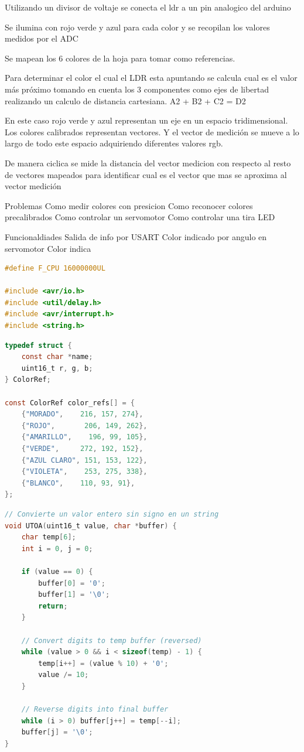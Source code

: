 Utilizando un divisor de voltaje se conecta el ldr a un pin analogico del arduino

Se ilumina con rojo verde y azul para cada color y se recopilan los valores medidos por el ADC

Se mapean los 6 colores de la hoja para tomar como referencias.

Para determinar el color el cual el LDR esta apuntando
se calcula cual es el valor más próximo tomando
en cuenta los 3 componentes como ejes de libertad
realizando un calculo de distancia cartesiana.
A2 + B2 + C2 = D2

En este caso rojo verde y azul representan un eje en un espacio tridimensional. 
Los colores calibrados representan vectores. Y el vector de medición se 
mueve a lo largo de todo este espacio adquiriendo diferentes valores rgb.

De manera ciclica se mide la distancia del vector medicion con respecto 
al resto de vectores mapeados para identificar cual es el vector que 
mas se aproxima al vector medición

Problemas
Como medir colores con presicion
Como reconocer colores precalibrados
Como controlar un servomotor
Como controlar una tira LED

Funcionaldiades
Salida de info por USART
Color indicado por angulo en servomotor
Color indica








\begin{lstlisting}[language=C, caption={Librerias utilizadas}]
#define F_CPU 16000000UL

#include <avr/io.h>
#include <util/delay.h>
#include <avr/interrupt.h>
#include <string.h>
\end{lstlisting}

\begin{lstlisting}[language=C, caption={Mapeado de colores}]
typedef struct {
	const char *name;
	uint16_t r, g, b;
} ColorRef;

const ColorRef color_refs[] = {
	{"MORADO",    216, 157, 274},
	{"ROJO",       206, 149, 262},
	{"AMARILLO",    196, 99, 105},
	{"VERDE",     272, 192, 152},
	{"AZUL CLARO", 151, 153, 122},
	{"VIOLETA",    253, 275, 338},
	{"BLANCO",    110, 93, 91},
};
\end{lstlisting}

\begin{lstlisting}[language=C, caption={Convertidor de unsigned integer a string}]
// Convierte un valor entero sin signo en un string
void UTOA(uint16_t value, char *buffer) { 
	char temp[6];
	int i = 0, j = 0;

	if (value == 0) {
		buffer[0] = '0';
		buffer[1] = '\0';
		return;
	}

	// Convert digits to temp buffer (reversed)
	while (value > 0 && i < sizeof(temp) - 1) {
		temp[i++] = (value % 10) + '0';
		value /= 10;
	}

	// Reverse digits into final buffer
	while (i > 0) buffer[j++] = temp[--i];
	buffer[j] = '\0';
}
\end{lstlisting}

